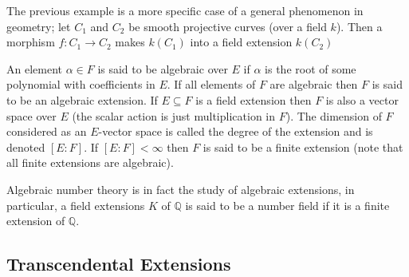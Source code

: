 \begin{example} The previous example is a more specific case of a general
phenomenon in geometry; let $C_1$ and $C_2$ be smooth projective curves (over a
field $k$). Then a morphism $f:C_1\rightarrow C_2$ makes $k(C_1)$ into a field
extension $k(C_2)$ \end{example}

\begin{definition}An element $\alpha\in F$ is said to be algebraic over $E$ if $\alpha$ is the root of some polynomial with coefficients in $E$. If all elements of $F$ are algebraic then $F$ is said to be an algebraic extension. If $E\subseteq F$ is a field extension then $F$ is also a vector space over $E$ (the scalar action is just multiplication in $F$). The dimension of $F$ considered as an $E$-vector space is called the degree of the extension and is denoted $[E:F]$. If $[E:F]<\infty$ then $F$ is said to be a finite extension (note that all finite extensions are algebraic). \end{definition}
Algebraic number theory is in fact the study of algebraic extensions, in particular, a field extensions $K$ of $\mathbb{Q}$ is said to be a number field if it is a finite extension of $\mathbb{Q}$.
\subsection{Transcendental Extensions}

